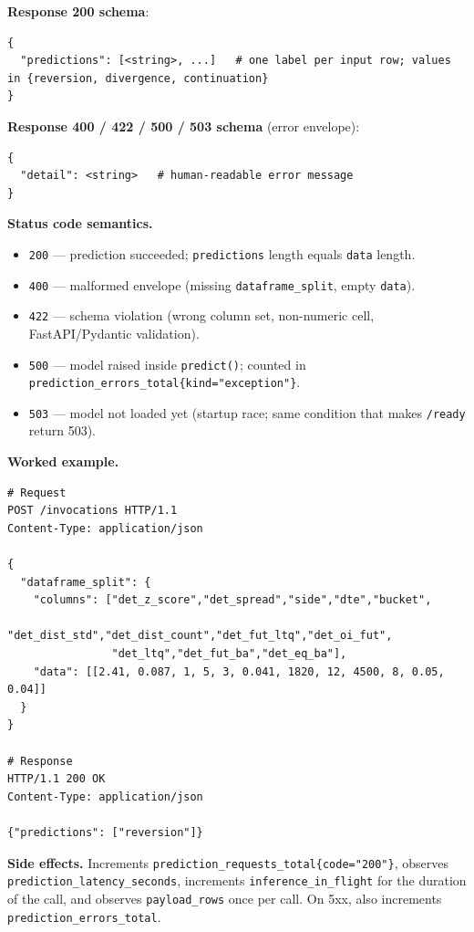 \documentclass[11pt,a4paper]{article}
\begin{document}
\textbf{Response 200 schema}:
\begin{lstlisting}[style=bashstyle]
{
  "predictions": [<string>, ...]   # one label per input row; values in {reversion, divergence, continuation}
}
\end{lstlisting}

\textbf{Response 400 / 422 / 500 / 503 schema} (error envelope):
\begin{lstlisting}[style=bashstyle]
{
  "detail": <string>   # human-readable error message
}
\end{lstlisting}

\textbf{Status code semantics.}
\begin{itemize}[leftmargin=1.5em,itemsep=0pt]
  \item \texttt{200} --- prediction succeeded; \texttt{predictions} length equals \texttt{data} length.
  \item \texttt{400} --- malformed envelope (missing \texttt{dataframe\_split}, empty \texttt{data}).
  \item \texttt{422} --- schema violation (wrong column set, non-numeric cell, FastAPI/Pydantic validation).
  \item \texttt{500} --- model raised inside \texttt{predict()}; counted in \texttt{prediction\_errors\_total\{kind="exception"\}}.
  \item \texttt{503} --- model not loaded yet (startup race; same condition that makes \texttt{/ready} return 503).
\end{itemize}

\textbf{Worked example.}
\begin{lstlisting}[style=bashstyle]
# Request
POST /invocations HTTP/1.1
Content-Type: application/json

{
  "dataframe_split": {
    "columns": ["det_z_score","det_spread","side","dte","bucket",
                "det_dist_std","det_dist_count","det_fut_ltq","det_oi_fut",
                "det_ltq","det_fut_ba","det_eq_ba"],
    "data": [[2.41, 0.087, 1, 5, 3, 0.041, 1820, 12, 4500, 8, 0.05, 0.04]]
  }
}

# Response
HTTP/1.1 200 OK
Content-Type: application/json

{"predictions": ["reversion"]}
\end{lstlisting}

\textbf{Side effects.} Increments \texttt{prediction\_requests\_total\{code="200"\}}, observes \texttt{prediction\_latency\_seconds}, increments \texttt{inference\_in\_flight} for the duration of the call, and observes \texttt{payload\_rows} once per call. On 5xx, also increments \texttt{prediction\_errors\_total}.
\end{document}
